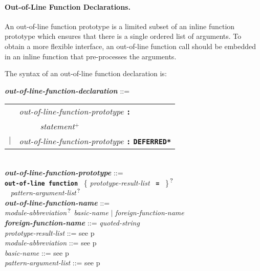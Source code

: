 \documentclass[12pt]{article}
\newcommand{\subsubsubsection}[1]{\paragraph[#1]{#1.}}
\newcommand{\TT}[1]{{\tt \bfseries #1}}
\newcommand{\PLUS}[1][]{{$^{+#1}$}}
\newcommand{\QMARK}{{$^{\,\mbox{\footnotesize ?}}$}}
\newcommand{\ttkey}[1]{{\tt \bfseries #1}}
\newcommand{\emkey}[1]{{\em \bfseries #1}}
\newcommand{\pagref}[1]{p\pageref{#1}}
\newenvironment{indpar}[1][0.3in]%
	{\begin{list}{}%
		     {\setlength{\itemsep}{0in}%
		      \setlength{\topsep}{0in}%
		      \setlength{\parsep}{1ex}%
		      \setlength{\labelwidth}{#1}%
		      \setlength{\leftmargin}{#1}%
		      \addtolength{\leftmargin}{\labelsep}}%
	 \item}%
	{\end{list}}
\begin{document}
\subsubsubsection{Out-of-Line Function Declarations}
\label{OUT-OF-LINE-FUNCTION-DECLARATIONS}

An out-of-line function prototype is a limited subset of
an inline function prototype which ensures that there is
a single ordered list of arguments.  To obtain a more
flexible interface, an out-of-line function call should
be embedded in an inline function that pre-processes the
arguments.

The syntax of an out-of-line function declaration is:

\begin{indpar}
\emkey{out-of-line-function-declaration}%
	\label{OUT-OF-LINE-FUNCTION-DECLARATION} ::= \\
\hspace*{0.5in}
    \begin{tabular}[t]{rl}
        &  {\em out-of-line-function-prototype} \TT{:} \\
	& \TT{~~~~~}{\em statement}\PLUS{} \\
    $|$ &  {\em out-of-line-function-prototype} \TT{:} \ttkey{*DEFERRED*} \\
    \end{tabular}
\\[2ex]
\emkey{out-of-line-function-prototype}%
	\label{OUT-OF-LINE-FUNCTION-PROTOTYPE} ::= \\
\hspace*{0.25in} \ttkey{out-of-line function}~
          \{ {\em prototype-result-list}~ \TT{=}~ \}\QMARK{} \\
\hspace*{0.5in}{\em out-of-line-function-name}~
	      {\em pattern-argument-list}\QMARK{}
\\[0.5ex]
\emkey{out-of-line-function-name} ::= \\
\hspace*{0.25in}
    {\em module-abbreviation}\QMARK{} {\em basic-name}
    $|$ {\em foreign-function-name}
\\[0.5ex]
\emkey{foreign-function-name} ::= {\em quoted-string}
\\[0.5ex]
{\em prototype-result-list} ::= see \pagref{PROTOTYPE-RESULT-LIST}
\\[0.5ex]
{\em module-abbreviation} ::= see \pagref{MODULE-ABBREVIATION}
\\[0.5ex]
{\em basic-name} ::= see \pagref{BASIC-NAME}
\\[0.5ex]
{\em pattern-argument-list} ::= see \pagref{PATTERN-ARGUMENT-LIST}


\end{indpar}
\end{document}
